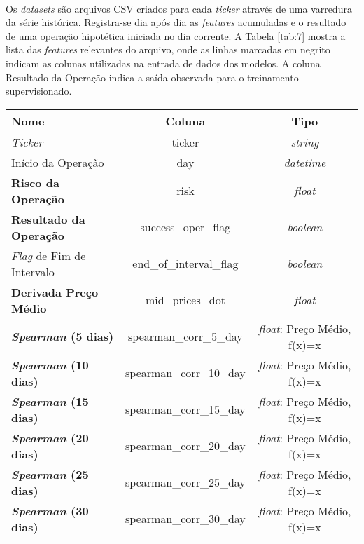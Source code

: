 \paragraph{} Os \textit{datasets} são arquivos CSV criados para cada \textit{ticker} através de uma varredura da série histórica. Registra-se dia após dia as \textit{features} acumuladas e o resultado de uma operação hipotética iniciada no dia corrente. A Tabela \ref{tab:7} mostra a lista das \textit{features} relevantes do arquivo, onde as linhas marcadas em negrito indicam as colunas utilizadas na entrada de dados dos modelos. A coluna Resultado da Operação indica a saída observada para o treinamento supervisionado.

\begin{table}[h!]
    \begin{center}
        \begin{tabular}{ l|c|c }
            Nome & Coluna & Tipo \\
            \hline
            \textit{Ticker} & ticker & \textit{string} \\
            Início da Operação & day & \textit{datetime} \\
            \textbf{Risco da Operação} & risk & \textit{float} \\
            \textbf{Resultado da Operação} & success\_oper\_flag & \textit{boolean} \\
            \textit{Flag} de Fim de Intervalo & end\_of\_interval\_flag & \textit{boolean} \\
            \textbf{Derivada Preço Médio} & mid\_prices\_dot & \textit{float} \\
            \textbf{\textit{Spearman} (5 dias)} & spearman\_corr\_5\_day & \textit{float}: Preço Médio, f(x)=x \\
            \textbf{\textit{Spearman} (10 dias)} & spearman\_corr\_10\_day & \textit{float}: Preço Médio, f(x)=x \\
            \textbf{\textit{Spearman} (15 dias)} & spearman\_corr\_15\_day & \textit{float}: Preço Médio, f(x)=x \\
            \textbf{\textit{Spearman} (20 dias)} & spearman\_corr\_20\_day & \textit{float}: Preço Médio, f(x)=x \\
            \textbf{\textit{Spearman} (25 dias)} & spearman\_corr\_25\_day & \textit{float}: Preço Médio, f(x)=x \\
            \textbf{\textit{Spearman} (30 dias)} & spearman\_corr\_30\_day & \textit{float}: Preço Médio, f(x)=x \\

\end{tabular}
\end{center}
\end{table}
